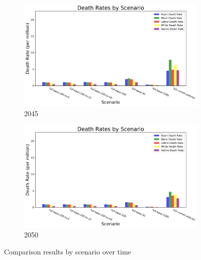 \documentclass[a4paper]{article}
\theoremstyle{definition}
\theoremstyle{plain}
\begin{document}
\begin{figure}
    \begin{subfigure}[b]{0.49\textwidth}
        \includegraphics[width=\textwidth]{Figures/Output/Compare_scenarios_all-scenarios_2045_GenX.jpg}
        \caption{2045}
        \label{Subfig2}
    \end{subfigure}
    \hfill
    \begin{subfigure}[b]{0.49\textwidth}
        \includegraphics[width=\textwidth]{Figures/Output/Compare_scenarios_all-scenarios_2050_GenX.jpg}
        \caption{2050}
        \label{Subfig2}
    \end{subfigure}
    \caption{Comparison results by scenario over time}
    \label{Compare Scenarios}
\end{figure}
\end{document}
